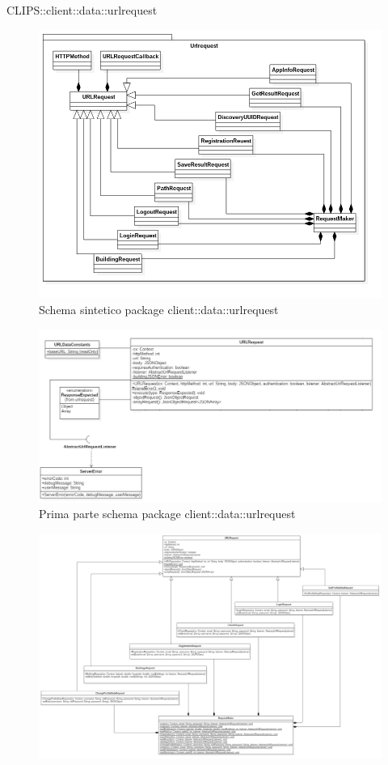 \begin{componente}{CLIPS::client::data::urlrequest}
\begin{figure}[h!]
	\centering
	\includegraphics[scale=0.45]{img/package/png/client--urlrequest--min.png}
	\caption{Schema sintetico package client::data::urlrequest}
\end{figure}
\begin{figure}[h!]
	\centering
	\includegraphics[scale=0.5]{img/package/png/client--urlrequest1.png}
	\caption{Prima parte schema package client::data::urlrequest}
\end{figure}
\begin{figure}[h!]
	\centering
	\includegraphics[scale=0.30]{img/package/png/client--urlrequest2.png}

\end{figure}
\end{componente}
